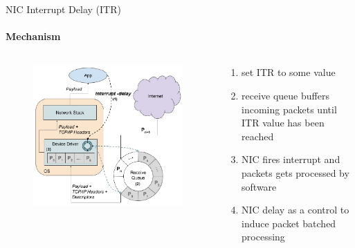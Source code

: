 \documentclass[notes=only,10pt,xcolor=table]{beamer}
\begin{document}
\begin{frame}{NIC Interrupt Delay (ITR)}
\framesubtitle{Mechanism}
 {
\begin{columns}
    \begin{column}{.5\textwidth}
        \begin{figure}
            \includegraphics[width=1\textwidth]{img/itr_fig.pdf}
        \end{figure}
    \end{column}
    \begin{column}{.5\textwidth}
        \begin{enumerate}
            \item set ITR to some value
            \item receive queue buffers incoming packets until ITR value has been reached
            \item NIC fires interrupt and packets gets processed by software
            \item NIC delay as a control to induce packet batched processing

\end{enumerate}
\end{column}
\end{columns}}
\end{frame}
\end{document}
